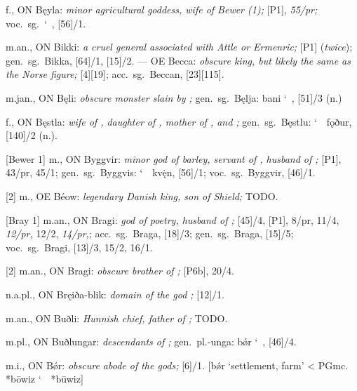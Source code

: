 \begin{itemize}
 f., ON Bęyla:
  \emph{minor agricultural goddess, wife of Bewer (1);} [P1], \emph{55/pr;} voc.~sg.~\char`~, [56]/1.

 m.an., ON Bikki:
  \emph{a cruel general associated with Attle or Ermenric;} [P1] (\emph{twice}); gen.~sg.~Bikka, [64]/1, [15]/2. ---
  OE Becca: \emph{obscure king, but likely the same as the Norse figure;} [4][19]; acc.~sg.~Beccan, [23][115].

 m.jan., ON Bęli:
  \emph{obscure monster slain by ;} gen.~sg.~Bęlja: bani \char`~, [51]/3 (n.)

 f., ON Bęstla:
  \emph{wife of , daughter of , mother of ,  and ;} gen.~sg.~Bęstlu: \char`~\ fǫður, [140]/2 (n.).

[Bewer 1] m., ON Byggvir:
  \emph{minor god of barley, servant of , husband of ;} [P1], 43/pr, 45/1; gen.~sg.~Byggvis: \char`~\ kvę̇n, [56]/1; voc.~sg.~Byggvir, [46]/1.

[2] m., OE Béow:
  \emph{legendary Danish king, son of Shield;} TODO.

[Bray 1] m.an., ON Bragi:
  \emph{god of poetry, husband of ;} [45]/4, [P1], 8/pr, 11/4, \emph{12/pr,} 12/2, \emph{14/pr,}; acc.~sg.~Braga, [18]/3; gen.~sg.~Braga, [15]/5; voc.~sg.~Bragi, [13]/3, 15/2, 16/1.

[2] m.an., ON Bragi:
  \emph{obscure brother of ;} [P6b], 20/4.

 n.a.pl., ON Bręiða-blik:
  \emph{domain of the god ;} [12]/1.

 m.an., ON Buðli:
  \emph{Hunnish chief, father of ;} TODO.

 m.pl., ON Buðlungar:
  \emph{descendants of ;} gen.~pl.-unga: bǿr \char`~, [46]/4.

 m.i., ON Bǿr:
  \emph{obscure abode of the gods;} [6]/1.
  [bǿr ‘settlement, farm’ < PGmc. *bōwiz \char`~\ *būwiz]


\end{itemize}
